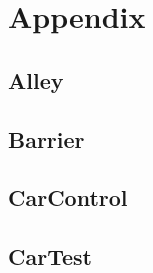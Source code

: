 \section{Appendix}

\subsection{Alley}


\newpage

\subsection{Barrier}


\newpage

\subsection{CarControl}


\newpage

\subsection{CarTest}


